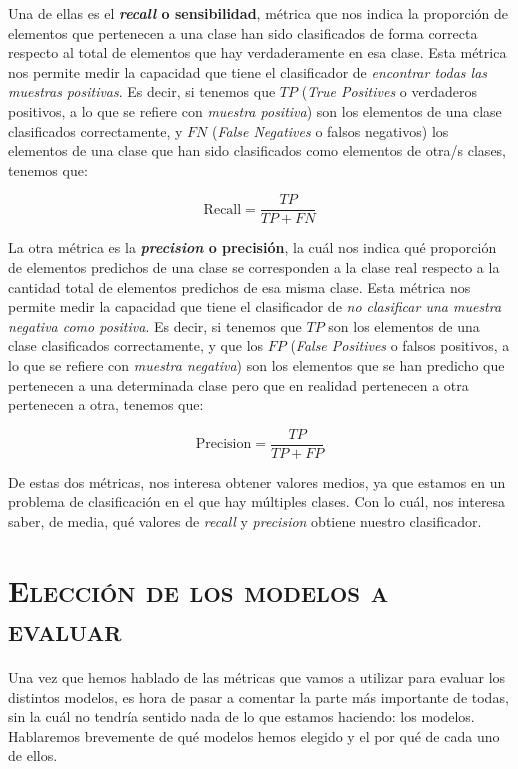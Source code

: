 \documentclass[11pt,a4paper]{article}
\begin{document}
Una de ellas es el \textbf{\textit{recall} o sensibilidad}, métrica que nos indica la proporción de elementos que pertenecen a una clase han sido
clasificados de forma correcta respecto al total de elementos que hay verdaderamente en esa clase. Esta métrica nos permite medir la
capacidad que tiene el clasificador de \textit{encontrar todas las muestras positivas}\cite{bib:recall}. Es decir, si tenemos que $TP$
(\textit{True Positives} o verdaderos positivos, a lo que se refiere con \textit{muestra positiva}) son los elementos de una clase
clasificados correctamente, y $FN$ (\textit{False Negatives} o falsos negativos) los elementos de una clase que han sido clasificados como
elementos de otra/s clases, tenemos que:

\[ 
\text{Recall} = \frac{TP}{TP + FN}
\]

La otra métrica es la \textbf{\textit{precision} o precisión}, la cuál nos indica qué proporción de elementos predichos de una clase se corresponden
a la clase real respecto a la cantidad total de elementos predichos de esa misma clase. Esta métrica nos permite medir la capacidad que tiene
el clasificador de \textit{no clasificar una muestra negativa como positiva}\cite{bib:precision}. Es decir, si tenemos que $TP$ son los
elementos de una clase clasificados correctamente, y que los $FP$ (\textit{False Positives} o falsos positivos, a lo que se refiere con
\textit{muestra negativa}) son los elementos que se han predicho que pertenecen a una determinada clase pero que en realidad pertenecen a
otra pertenecen a otra, tenemos que:

\[ 
\text{Precision} = \frac{TP}{TP + FP}
\]

De estas dos métricas, nos interesa obtener valores medios, ya que estamos en un problema de clasificación en el que hay múltiples clases.
Con lo cuál, nos interesa saber, de media, qué valores de \textit{recall} y \textit{precision} obtiene nuestro clasificador.

\section{\textsc{Elección de los modelos a evaluar}}

Una vez que hemos hablado de las métricas que vamos a utilizar para evaluar los distintos modelos, es hora de pasar a comentar la parte más
importante de todas, sin la cuál no tendría sentido nada de lo que estamos haciendo: los modelos. Hablaremos brevemente de qué modelos hemos
elegido y el por qué de cada uno de ellos.
\end{document}
